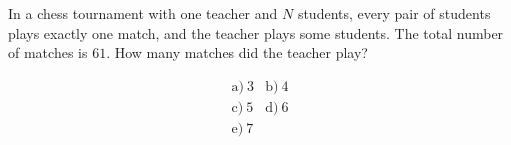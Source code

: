 In a chess tournament with one teacher and \(N\) students, every pair of students plays exactly one match, and the teacher plays some students. The total number of matches is \(61\). How many matches did the teacher play?



\[
\begin{array}{ll}
\text{a)}\ 3 & \text{b)}\ 4 \\
\text{c)}\ 5 & \text{d)}\ 6 \\
\text{e)}\ 7
\end{array}
\]
